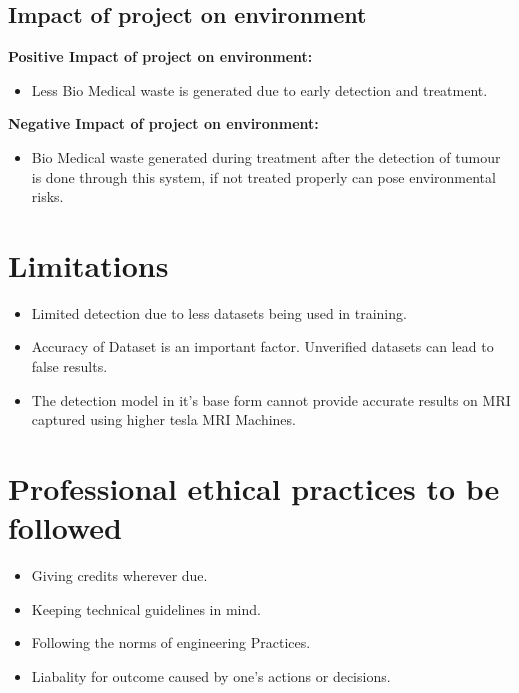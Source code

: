 \subsection{Impact of project on environment }
{\textbf{Positive Impact of project on environment: }}
\begin{itemize}
    \item Less Bio Medical waste is generated due to early detection and treatment.
\end{itemize} 
{\textbf{Negative Impact of project on environment: }}
\begin{itemize}
    \item Bio Medical waste generated during treatment after the detection of tumour is done through this system, if not treated properly can pose environmental risks.
\end{itemize}

\section{Limitations}
\begin{itemize}
    \item Limited detection due to less datasets being used in training.
    \item Accuracy of Dataset is an important factor. Unverified datasets can lead to false results.
    \item The detection model in it's base form cannot provide accurate results on MRI captured using higher tesla MRI Machines.
\end{itemize}

\section{Professional ethical practices to be followed}
\begin{itemize}
    \item Giving credits wherever due.
    \item Keeping technical guidelines in mind.
    \item Following the norms of engineering Practices.
    \item Liabality for outcome caused by one’s actions or decisions.
\end{itemize}
